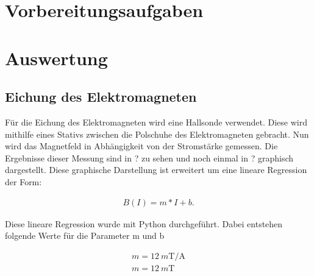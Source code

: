 \section{Vorbereitungsaufgaben}

\section{Auswertung}

\subsection{Eichung des Elektromagneten}

Für die Eichung des Elektromagneten wird eine Hallsonde verwendet. Diese wird mithilfe eines Stativs zwischen die Polschuhe des Elektromagneten gebracht. Nun wird das Magnetfeld in Abhängigkeit von der Stromstärke gemessen.
Die Ergebnisse dieser Messung sind in ? zu sehen und noch einmal in ? graphisch dargestellt. Diese graphische Darstellung ist erweitert um eine lineare Regression der Form:

\begin{align}
    B(I) = m * I + b.
\end{align}

Diese lineare Regression wurde mit Python durchgeführt. Dabei entstehen folgende Werte für die Parameter m und b

\begin{align}
    m = \SI[separate-uncertainty=true]{12}{m\tesla \per \ampere} \\
    m = \SI[separate-uncertainty=true]{12}{m\tesla}
\end{align}
